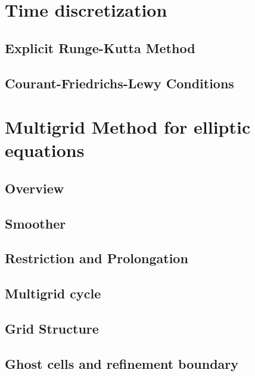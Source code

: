 \section{Time discretization}
\subsection{Explicit Runge-Kutta Method}
\subsection{Courant-Friedrichs-Lewy Conditions}

\section{Multigrid Method for elliptic equations} %
\label{section3.1}

\subsection{Overview} %
\label{section3.1.1}

\subsection{Smoother} %
\label{section3.1.2}

\subsection{Restriction and Prolongation} %
\label{section3.1.3}

\subsection{Multigrid cycle} %
\label{section3.1.4}

\subsection{Grid Structure} %
\label{section3.1.5}

\subsection{Ghost cells and refinement boundary} %
